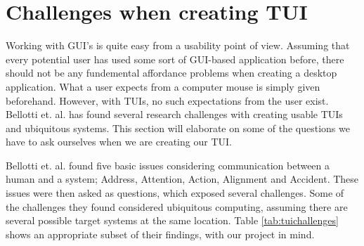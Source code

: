 \section{Challenges when creating TUI}
\label{sec:challenges-with-TUI}

Working with GUI's is quite easy from a usability point of view. Assuming that every potential user has used some sort of GUI-based application before, there should not be any fundemental affordance problems when creating a desktop application. What a user expects from a computer mouse is simply given beforehand. However, with TUIs, no such expectations from the user exist. Bellotti et. al.\cite{bellotti2002making} has found several research challenges with creating usable TUIs and ubiquitous systems. This section will elaborate on some of the questions we have to ask ourselves when we are creating our TUI.


Bellotti et. al. found five basic issues considering communication between a human and a system; Address, Attention, Action, Alignment and Accident.  
These issues were then asked as questions, which exposed several challenges. 
Some of the challenges they found considered ubiquitous computing, assuming there are several possible target systems at the same location. Table \ref{tab:tuichallenges} shows an appropriate subset of their findings, with our project in mind.   

